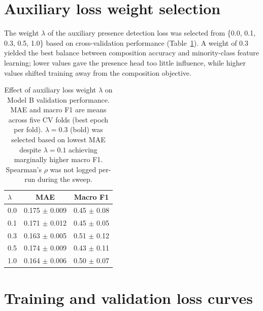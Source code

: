 \documentclass[10pt,twocolumn]{article}
\begin{document}





\appendix
\section{Auxiliary loss weight selection}
\label{app:lambda}

The weight $\lambda$ of the auxiliary presence detection loss was selected from \{0.0, 0.1, 0.3, 0.5, 1.0\} based on cross-validation performance (Table~\ref{tab:lambda_appendix}). A weight of 0.3 yielded the best balance between composition accuracy and minority-class feature learning; lower values gave the presence head too little influence, while higher values shifted training away from the composition objective.

\begin{table}[ht]
    \centering
    \caption{Effect of auxiliary loss weight $\lambda$ on Model B validation performance. MAE and macro F1 are means across five CV folds (best epoch per fold). $\lambda = 0.3$ (bold) was selected based on lowest MAE despite $\lambda = 0.1$ achieving marginally higher macro F1. Spearman's $\rho$ was not logged per-run during the sweep.}
    \label{tab:lambda_appendix}
    \begin{tabular}{lcc}
        \toprule
        $\lambda$ & MAE & Macro F1 \\
        \midrule
        0.0 & 0.175 $\pm$ 0.009 & 0.45 $\pm$ 0.08 \\
        0.1 & 0.171 $\pm$ 0.012 & 0.45 $\pm$ 0.05 \\
        0.3 & 0.163 $\pm$ 0.005 & 0.51 $\pm$ 0.12 \\
        0.5 & 0.174 $\pm$ 0.009 & 0.43 $\pm$ 0.11 \\
        1.0 & 0.164 $\pm$ 0.006 & 0.50 $\pm$ 0.07 \\
        \bottomrule
    \end{tabular}
\end{table}

\section{Training and validation loss curves}
\label{app:losscurves}
\end{document}
